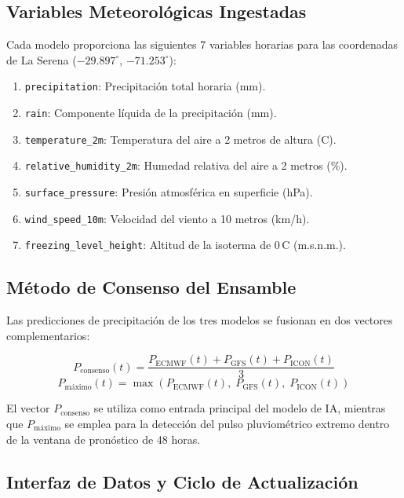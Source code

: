 \documentclass[11pt,a4paper]{article}
\begin{document}
\subsection{Variables Meteorológicas Ingestadas}

Cada modelo proporciona las siguientes 7 variables horarias para las coordenadas de La Serena ($-29.897^{\circ}$, $-71.253^{\circ}$):

\begin{enumerate}
    \item \texttt{precipitation}: Precipitación total horaria (mm).
    \item \texttt{rain}: Componente líquida de la precipitación (mm).
    \item \texttt{temperature\_2m}: Temperatura del aire a 2 metros de altura (\textdegree C).
    \item \texttt{relative\_humidity\_2m}: Humedad relativa del aire a 2 metros (\%).
    \item \texttt{surface\_pressure}: Presión atmosférica en superficie (hPa).
    \item \texttt{wind\_speed\_10m}: Velocidad del viento a 10 metros (km/h).
    \item \texttt{freezing\_level\_height}: Altitud de la isoterma de 0\,\textdegree C (m.s.n.m.).
\end{enumerate}

\subsection{Método de Consenso del Ensamble}

Las predicciones de precipitación de los tres modelos se fusionan en dos vectores complementarios:

\begin{equation}
    P_{\text{consenso}}(t) = \frac{P_{\text{ECMWF}}(t) + P_{\text{GFS}}(t) + P_{\text{ICON}}(t)}{3}
\end{equation}
\begin{equation}
    P_{\text{máximo}}(t) = \max\left(P_{\text{ECMWF}}(t),\; P_{\text{GFS}}(t),\; P_{\text{ICON}}(t)\right)
\end{equation}

El vector $P_{\text{consenso}}$ se utiliza como entrada principal del modelo de IA, mientras que $P_{\text{máximo}}$ se emplea para la detección del pulso pluviométrico extremo dentro de la ventana de pronóstico de 48 horas.

\subsection{Interfaz de Datos y Ciclo de Actualización}
\end{document}
